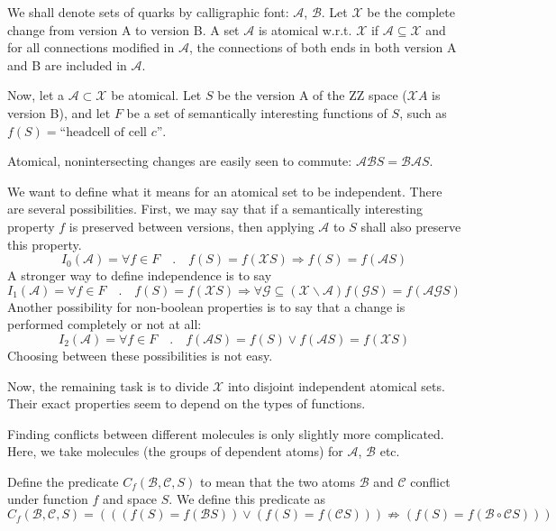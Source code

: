 \documentclass[12pt]{article}
\begin{document}
\def\atom#1{{\mathcal #1}}

\thispagestyle{empty}
\pagestyle{empty}


We shall denote sets of quarks by calligraphic font: $\atom A$, $\atom B$.
Let $\atom X$ be the complete change from version A to version B.
A set $\atom A$ is atomical w.r.t. $\atom X$ if
$\atom A \subseteq \atom X$ and for all connections modified in $\atom A$,
the connections of both ends in both version A and B are included in $\atom A$.

Now, let a $\atom A \subset \atom X$ be atomical.
Let $S$ be the version A of the ZZ space ($\atom X A$ is version B), 
and 
let 
$F$ be a set of semantically interesting functions of $S$,
such as $f(S) = \mbox{``headcell of cell $c$''}$.


Atomical, nonintersecting changes
are easily seen to commute: $\atom A \atom B S = \atom B \atom A S$.

We want to define what it means for an atomical set to be independent.
There are several possibilities. 
First, we may say that if a semantically interesting property $f$
is preserved between versions, then applying $\atom A$ to $S$ 
shall also preserve this property.
$$
I_0(\atom A) =
    \forall f \in F \quad . \quad
		f(S) = f(\atom X S) \Rightarrow 
		f(S) = f(\atom A S)
$$
A stronger way to define independence is to say
$$
I_1(\atom A) =
    \forall f \in F \quad . \quad
		f(S) = f(\atom X S) \Rightarrow 
		    \forall \atom G \subseteq ( \atom X \backslash \atom A)
			f(\atom G S) = f(\atom A \atom G S)
$$
Another possibility for non-boolean properties is to 
say that a change is performed completely or not at all:
$$
I_2(\atom A) = 
    \forall f \in F \quad . \quad
	f(\atom A S) = f(S) \vee
	f(\atom A S) = f(\atom X S)
$$
Choosing between these possibilities is not easy.

Now, the remaining task is to divide $\atom X$ into 
disjoint independent atomical sets.
Their exact properties seem to depend on the types of functions.


\pagebreak


Finding conflicts between different molecules is only slightly
more complicated.
Here, we take molecules (the groups of dependent atoms) for
$\atom A$, $\atom B$ etc.

Define the predicate $C_f(\atom B, \atom C, S)$
to mean that the two atoms $\atom B$ and $\atom C$ conflict
under function $f$ and space $S$.
We define this predicate as
$$
    C_f(\atom B, \atom C, S) =
    (
	((f(S) = f(\atom B S)) \vee (f(S) = f(\atom C S)))
	    \not \Rightarrow 
	    (f(S) = f(\atom B \circ \atom C S))
    )
$$
\end{document}
